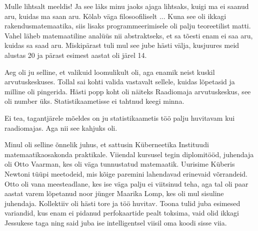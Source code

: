 
Mulle lihtsalt meeldis! Ja see läks minu jaoks ajaga 
lihtsaks, kuigi ma ei saanud aru, kuidas ma saan 
aru. Kõlab väga filosoofiliselt ... Kuna see oli ikkagi rakendusmatemaatika, siis 
lisaks programmeerimisele oli palju teoreetilist matti. Vahel läheb matemaatiline analüüs nii abstraktseks, et sa 
tõesti enam ei saa aru, kuidas sa saad aru. Miskipärast tuli mul see jube hästi välja, kusjuures meid alustas 20 
ja pärast esimest aastat oli järel 14. 


Aeg oli ju selline, et valikuid loomulikult oli, aga enamik neist kuskil arvutuskeskuses. Tollal sai
kohti valida vastavalt sellele, kuidas lõpetasid ja milline oli 
pingerida. Hästi popp koht oli näiteks Raadiomaja 
arvutuskeskus, see oli number üks. 
Statistikaametisse ei tahtnud keegi minna.


Ei tea, tagantjärele mõeldes on ju
statistikaametis töö palju huvitavam kui raadiomajas. Aga nii see 
kahjuks oli.

Minul oli selline õnnelik juhus, et sattusin Küberneetika 
Instituudi matemaatikaosakonda praktikale. Viiendal kursusel tegin 
diplomitööd, juhendaja oli Otto Vaarman, kes oli väga tunnustatud matemaatik. Uurisime Küberis Newtoni tüüpi meetodeid, mis kõige paremini 
lahendavad erinevaid võrrandeid. Otto oli vana meesteadlane, kes ise 
väga palju ei viitsinud teha, aga tal oli paar 
aastat varem lõpetanud noor jünger Maarika Lomp, kes oli 
mul sisuline juhendaja. Kollektiiv oli hästi tore ja töö 
huvitav. Toona tulid juba esimesed variandid, kus enam ei 
pidanud perfokaartide pealt toksima, vaid olid ikkagi 
Jessukese taga ning said juba ise intelligentsel viisil oma 
koodi sisse viia.

